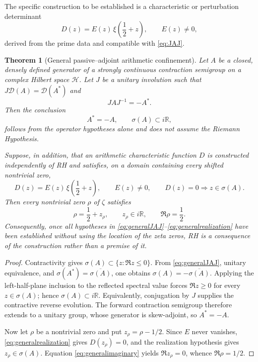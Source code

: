 \documentclass[11pt]{amsart}
\newtheorem{theorem}{Theorem}[section]
\theoremstyle{definition}
\theoremstyle{remark}
\begin{document}
The specific construction to be established is a characteristic or perturbation determinant
\begin{equation}\label{eq:determinanttarget}
 D(z)=E(z)\,\xi\!\left(\frac12+z\right),
 \qquad E(z)\ne0,
\end{equation}
derived from the prime data and compatible with \eqref{eq:JAJ}.

\begin{theorem}[General passive--adjoint arithmetic confinement]\label{thm:general-passive-adjoint}
Let $A$ be a closed, densely defined generator of a strongly continuous contraction
semigroup on a complex Hilbert space $\mathcal H$.  Let $J$ be a unitary involution such that
$J\mathcal D(A)=\mathcal D(A^*)$ and
\begin{equation}\label{eq:generalJAJ}
 JAJ^{-1}=-A^*.
\end{equation}
Then the conclusion
\begin{equation}\label{eq:generalimaginary}
 A^*=-A,
 \qquad \sigma(A)\subset i\mathbb R,
\end{equation}
follows from the operator hypotheses alone and does not assume the Riemann Hypothesis.

Suppose, in addition, that an arithmetic characteristic function $D$ is constructed
independently of RH and satisfies, on a domain containing every shifted nontrivial zero,
\begin{equation}\label{eq:generalrealization}
 D(z)=E(z)\,\xi\!\left(\frac12+z\right),
 \qquad E(z)\ne0,
 \qquad D(z)=0\Longrightarrow z\in\sigma(A).
\end{equation}
Then every nontrivial zero $\rho$ of $\zeta$ satisfies
\begin{equation}\label{eq:generalRHconclusion}
 \rho=\frac12+z_\rho,
 \qquad z_\rho\in i\mathbb R,
 \qquad \Re\rho=\frac12.
\end{equation}
Consequently, once all hypotheses in \eqref{eq:generalJAJ}--\eqref{eq:generalrealization}
have been established without using the location of the zeta zeros, RH is a consequence of
the construction rather than a premise of it.
\end{theorem}

\begin{proof}
Contractivity gives $\sigma(A)\subset\{z:\Re z\le0\}$.  From
\eqref{eq:generalJAJ}, unitary equivalence, and
$\sigma(A^*)=\overline{\sigma(A)}$, one obtains
$\sigma(A)=-\overline{\sigma(A)}$.  Applying the left-half-plane inclusion to the reflected
spectral value forces $\Re z\ge0$ for every $z\in\sigma(A)$; hence
$\sigma(A)\subset i\mathbb R$.  Equivalently, conjugation by $J$ supplies the contractive
reverse evolution.  The forward contraction semigroup therefore extends to a unitary group,
whose generator is skew-adjoint, so $A^*=-A$.

Now let $\rho$ be a nontrivial zero and put $z_\rho=\rho-1/2$.  Since $E$ never vanishes,
\eqref{eq:generalrealization} gives $D(z_\rho)=0$, and the realization hypothesis gives
$z_\rho\in\sigma(A)$.  Equation \eqref{eq:generalimaginary} yields
$\Re z_\rho=0$, whence $\Re\rho=1/2$.
\end{proof}
\end{document}
